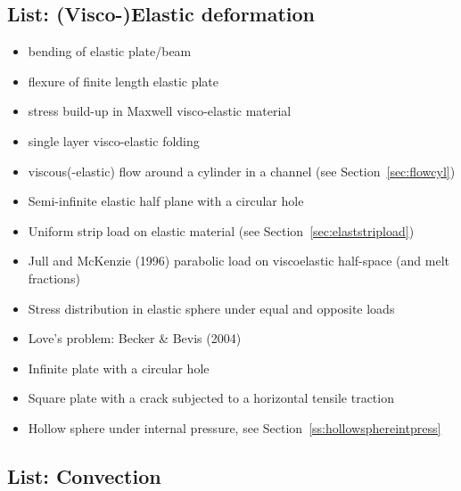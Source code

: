 \subsection{List: (Visco-)Elastic deformation}

\begin{itemize}

\item bending of elastic plate/beam \cite{cehg14,boht08a,vosc15,elga10,demh19,modm02,litu02}

\item flexure of finite length elastic plate \cite{chtl13}

\item stress build-up in Maxwell visco-elastic material 
      \cite{geyu07,chtl13,elga10,demh19}
\item single layer visco-elastic folding \cite{scps01,vosc15}
\item viscous(-elastic) flow around a cylinder in a channel (see Section~\ref{sec:flowcyl})
\item Semi-infinite elastic half plane with a circular hole \cite{verr98}
\item Uniform strip load on elastic material (see Section~\ref{sec:elaststripload})
\item Jull and McKenzie (1996) \cite{jumc96} parabolic load on viscoelastic half-space (and melt fractions) 
\item Stress distribution in elastic sphere under equal and 
      opposite loads \cite{stro52}
\item Love's problem: Becker \& Bevis (2004) \cite{bebe04}
\item Infinite plate with a circular hole \cite{yiha10,rama16}
\item Square plate with a crack subjected to a horizontal tensile 
      traction \cite{litu02}
\item Hollow sphere under internal pressure, see Section~\ref{ss:hollowsphereintpress}
\end{itemize}

\subsection{List: Convection}

